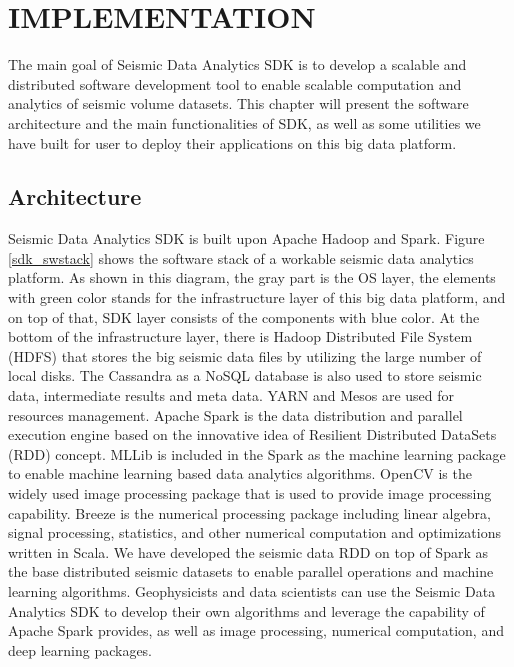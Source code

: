 %
%
%

\chapter{\uppercase{Implementation}}

The main goal of Seismic Data Analytics SDK is to develop a scalable and distributed software development tool to enable scalable computation and analytics of seismic volume datasets. This chapter will present the software architecture and the main functionalities of SDK, as well as some utilities we have built for user to deploy their applications on this big data platform.

\section{Architecture}

Seismic Data Analytics SDK is built upon Apache Hadoop and Spark. Figure \ref{sdk_swstack} shows the software stack of a workable seismic data analytics platform. As shown in this diagram, the gray part is the OS layer, the elements with green color stands for the infrastructure layer of this big data platform, and on top of that, SDK layer consists of the components with blue color. At the bottom of the infrastructure layer, there is Hadoop Distributed File System (HDFS) that stores the big seismic data files by utilizing the large number of local disks. The Cassandra as a NoSQL database is also used to store  seismic data, intermediate results and meta data. YARN and Mesos are used for resources management. Apache Spark is the data distribution and parallel execution engine based on the innovative idea of Resilient Distributed DataSets (RDD) concept. MLLib is included in the Spark as the machine learning package to enable machine learning based data analytics algorithms. OpenCV is the widely used image processing package that is used to provide image processing capability. Breeze is the numerical processing package including linear algebra, signal processing, statistics, and other numerical computation and optimizations written in Scala. We have developed the seismic data RDD on top of Spark as the base distributed seismic datasets to enable parallel operations and machine learning algorithms. Geophysicists and data scientists can use the Seismic Data Analytics SDK to develop their own algorithms and leverage the capability of Apache Spark provides, as well as image processing, numerical computation, and deep learning packages.

